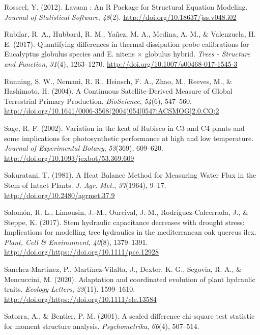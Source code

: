 \documentclass[11pt,twoside]{reedthesis}
\begin{document}
\hypertarget{ref-rosseel_lavaan_2012}{}
Rosseel, Y. (2012). Lavaan : An R Package for Structural Equation
Modeling. \emph{Journal of Statistical Software}, \emph{48}(2).
\url{http://doi.org/10.18637/jss.v048.i02}

\hypertarget{ref-Rubilar2017}{}
Rubilar, R. A., Hubbard, R. M., Yañez, M. A., Medina, A. M., \&
Valenzuela, H. E. (2017). Quantifying differences in thermal dissipation
probe calibrations for Eucalyptus globulus species and E. nitens ×
globulus hybrid. \emph{Trees - Structure and Function}, \emph{31}(4),
1263--1270. \url{http://doi.org/10.1007/s00468-017-1545-3}

\hypertarget{ref-Running2004}{}
Running, S. W., Nemani, R. R., Heinsch, F. A., Zhao, M., Reeves, M., \&
Hashimoto, H. (2004). A Continuous Satellite-Derived Measure of Global
Terrestrial Primary Production. \emph{BioScience}, \emph{54}(6),
547--560.
\href{http://doi.org/10.1641/0006-3568(2004)054\%5B0547:ACSMOG\%5D2.0.CO;2}{http://doi.org/10.1641/0006-3568(2004)054{[}0547:ACSMOG{]}2.0.CO;2}

\hypertarget{ref-Sage2002}{}
Sage, R. F. (2002). Variation in the kcat of Rubisco in C3 and C4 plants
and some implications for photosynthetic performance at high and low
temperature. \emph{Journal of Experimental Botany}, \emph{53}(369),
609--620. \url{http://doi.org/10.1093/jexbot/53.369.609}

\hypertarget{ref-Sakuratani1981}{}
Sakuratani, T. (1981). A Heat Balance Method for Measuring Water Flux in
the Stem of Intact Plants. \emph{J. Agr. Met.}, \emph{37}(1964), 9--17.
\url{http://doi.org/10.2480/agrmet.37.9}

\hypertarget{ref-Salomon2017}{}
Salomón, R. L., Limousin, J.-M., Ourcival, J.-M., Rodríguez-Calcerrada,
J., \& Steppe, K. (2017). Stem hydraulic capacitance decreases with
drought stress: Implications for modelling tree hydraulics in the
mediterranean oak quercus ilex. \emph{Plant, Cell \& Environment},
\emph{40}(8), 1379--1391.
\url{http://doi.org/https://doi.org/10.1111/pce.12928}

\hypertarget{ref-SanchezMartinez2020}{}
Sanchez-Martinez, P., Martínez-Vilalta, J., Dexter, K. G., Segovia, R.
A., \& Mencuccini, M. (2020). Adaptation and coordinated evolution of
plant hydraulic traits. \emph{Ecology Letters}, \emph{23}(11),
1599--1610. \url{http://doi.org/https://doi.org/10.1111/ele.13584}

\hypertarget{ref-satorra_scaled_2001}{}
Satorra, A., \& Bentler, P. M. (2001). A scaled difference chi-square
test statistic for moment structure analysis. \emph{Psychometrika},
\emph{66}(4), 507--514.
\end{document}
